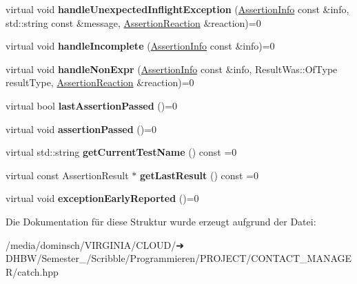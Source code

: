 \begin{DoxyCompactItemize}
\item 
\mbox{\label{structCatch_1_1IResultCapture_afc97bc69829185222f955ebeef97adfe}} 
virtual void {\bfseries handle\+Unexpected\+Inflight\+Exception} (\hyperlink{structCatch_1_1AssertionInfo}{Assertion\+Info} const \&info, std\+::string const \&message, \hyperlink{structCatch_1_1AssertionReaction}{Assertion\+Reaction} \&reaction)=0
\item 
\mbox{\label{structCatch_1_1IResultCapture_a89b89372eb09cc44f8dcad363de6157d}} 
virtual void {\bfseries handle\+Incomplete} (\hyperlink{structCatch_1_1AssertionInfo}{Assertion\+Info} const \&info)=0
\item 
\mbox{\label{structCatch_1_1IResultCapture_ab7dbdf8aa28427119583e24dbb302c63}} 
virtual void {\bfseries handle\+Non\+Expr} (\hyperlink{structCatch_1_1AssertionInfo}{Assertion\+Info} const \&info, Result\+Was\+::\+Of\+Type result\+Type, \hyperlink{structCatch_1_1AssertionReaction}{Assertion\+Reaction} \&reaction)=0
\item 
\mbox{\label{structCatch_1_1IResultCapture_a973435fbdcb2f6f07a0ec5719a01e956}} 
virtual bool {\bfseries last\+Assertion\+Passed} ()=0
\item 
\mbox{\label{structCatch_1_1IResultCapture_a9b0ef2cb071e9a9dc6ec1b533026aea7}} 
virtual void {\bfseries assertion\+Passed} ()=0
\item 
\mbox{\label{structCatch_1_1IResultCapture_aea1617f4a84cc648246aa3ed6918b5bf}} 
virtual std\+::string {\bfseries get\+Current\+Test\+Name} () const =0
\item 
\mbox{\label{structCatch_1_1IResultCapture_ab18872c89fab97405a56e9c6a4919736}} 
virtual const Assertion\+Result $\ast$ {\bfseries get\+Last\+Result} () const =0
\item 
\mbox{\label{structCatch_1_1IResultCapture_ae63ecec95db4c236c63ecf616f483810}} 
virtual void {\bfseries exception\+Early\+Reported} ()=0
\end{DoxyCompactItemize}


Die Dokumentation für diese Struktur wurde erzeugt aufgrund der Datei\+:\begin{DoxyCompactItemize}
\item 
/media/dominsch/\+V\+I\+R\+G\+I\+N\+I\+A/\+C\+L\+O\+U\+D/➔ D\+H\+B\+W/\+Semester\+\_/\+Scribble/\+Programmieren/\+P\+R\+O\+J\+E\+C\+T/\+C\+O\+N\+T\+A\+C\+T\+\_\+\+M\+A\+N\+A\+G\+E\+R/catch.\+hpp\end{DoxyCompactItemize}
